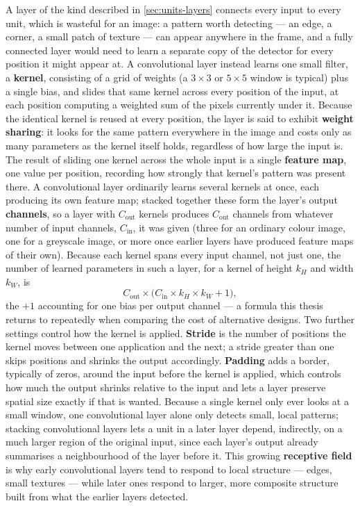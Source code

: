 A layer of the kind described in \autoref{sec:units-layers} connects every input to every unit, which is wasteful for an image: a pattern worth detecting --- an edge, a corner, a small patch of texture --- can appear anywhere in the frame, and a fully connected layer would need to learn a separate copy of the detector for every position it might appear at. A convolutional layer instead learns one small filter, a \textbf{kernel}, consisting of a grid of weights (a $3\times3$ or $5\times5$ window is typical) plus a single bias, and slides that same kernel across every position of the input, at each position computing a weighted sum of the pixels currently under it. Because the identical kernel is reused at every position, the layer is said to exhibit \textbf{weight sharing}: it looks for the same pattern everywhere in the image and costs only as many parameters as the kernel itself holds, regardless of how large the input is. The result of sliding one kernel across the whole input is a single \textbf{feature map}, one value per position, recording how strongly that kernel's pattern was present there. A convolutional layer ordinarily learns several kernels at once, each producing its own feature map; stacked together these form the layer's output \textbf{channels}, so a layer with $C_{\text{out}}$ kernels produces $C_{\text{out}}$ channels from whatever number of input channels, $C_{\text{in}}$, it was given (three for an ordinary colour image, one for a greyscale image, or more once earlier layers have produced feature maps of their own). Because each kernel spans every input channel, not just one, the number of learned parameters in such a layer, for a kernel of height $k_H$ and width $k_W$, is
\[
	C_{\text{out}} \times \bigl(C_{\text{in}} \times k_H \times k_W + 1\bigr),
\]
the $+1$ accounting for one bias per output channel --- a formula this thesis returns to repeatedly when comparing the cost of alternative designs. Two further settings control how the kernel is applied. \textbf{Stride} is the number of positions the kernel moves between one application and the next; a stride greater than one skips positions and shrinks the output accordingly. \textbf{Padding} adds a border, typically of zeros, around the input before the kernel is applied, which controls how much the output shrinks relative to the input and lets a layer preserve spatial size exactly if that is wanted. Because a single kernel only ever looks at a small window, one convolutional layer alone only detects small, local patterns; stacking convolutional layers lets a unit in a later layer depend, indirectly, on a much larger region of the original input, since each layer's output already summarises a neighbourhood of the layer before it. This growing \textbf{receptive field} is why early convolutional layers tend to respond to local structure --- edges, small textures --- while later ones respond to larger, more composite structure built from what the earlier layers detected.

